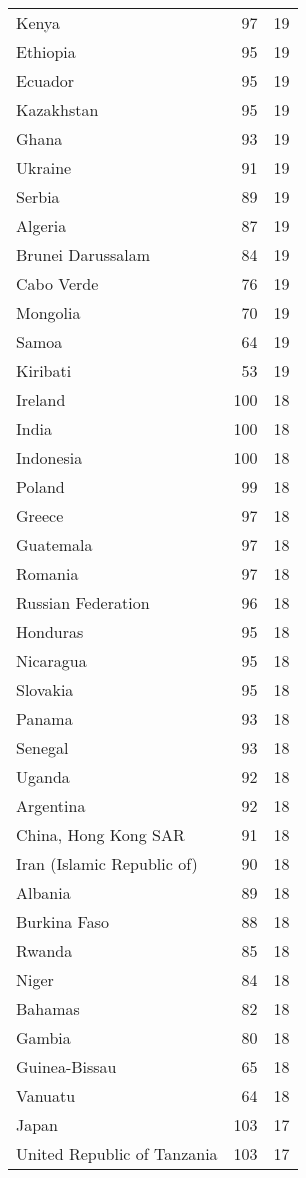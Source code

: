 \documentclass[]{article}
\begin{document}
\begin{longtable}[t]{lrr}
Kenya & 97 & 19\\
\addlinespace
Ethiopia & 95 & 19\\
Ecuador & 95 & 19\\
Kazakhstan & 95 & 19\\
Ghana & 93 & 19\\
Ukraine & 91 & 19\\
\addlinespace
Serbia & 89 & 19\\
Algeria & 87 & 19\\
Brunei Darussalam & 84 & 19\\
Cabo Verde & 76 & 19\\
Mongolia & 70 & 19\\
\addlinespace
Samoa & 64 & 19\\
Kiribati & 53 & 19\\
Ireland & 100 & 18\\
India & 100 & 18\\
Indonesia & 100 & 18\\
\addlinespace
Poland & 99 & 18\\
Greece & 97 & 18\\
Guatemala & 97 & 18\\
Romania & 97 & 18\\
Russian Federation & 96 & 18\\
\addlinespace
Honduras & 95 & 18\\
Nicaragua & 95 & 18\\
Slovakia & 95 & 18\\
Panama & 93 & 18\\
Senegal & 93 & 18\\
\addlinespace
Uganda & 92 & 18\\
Argentina & 92 & 18\\
China, Hong Kong SAR & 91 & 18\\
Iran (Islamic Republic of) & 90 & 18\\
Albania & 89 & 18\\
\addlinespace
Burkina Faso & 88 & 18\\
Rwanda & 85 & 18\\
Niger & 84 & 18\\
Bahamas & 82 & 18\\
Gambia & 80 & 18\\
\addlinespace
Guinea-Bissau & 65 & 18\\
Vanuatu & 64 & 18\\
Japan & 103 & 17\\
United Republic of Tanzania & 103 & 17\\

\end{longtable}
\end{document}
